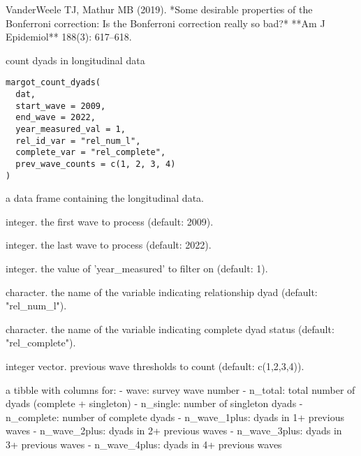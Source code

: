 \documentclass[a4paper]{book}
\begin{document}
%
\begin{References}
VanderWeele TJ, Mathur MB (2019).
*Some desirable properties of the Bonferroni correction:
Is the Bonferroni correction really so bad?*
**Am J Epidemiol** 188(3): 617–618.
\end{References}
%
\begin{Description}
count dyads in longitudinal data
\end{Description}
%
\begin{Usage}
\begin{verbatim}
margot_count_dyads(
  dat,
  start_wave = 2009,
  end_wave = 2022,
  year_measured_val = 1,
  rel_id_var = "rel_num_l",
  complete_var = "rel_complete",
  prev_wave_counts = c(1, 2, 3, 4)
)
\end{verbatim}
\end{Usage}
%
\begin{Arguments}
\begin{ldescription}
\item[\code{dat}] a data frame containing the longitudinal data.

\item[\code{start\_wave}] integer. the first wave to process (default: 2009).

\item[\code{end\_wave}] integer. the last wave to process (default: 2022).

\item[\code{year\_measured\_val}] integer. the value of 'year\_measured' to filter on (default: 1).

\item[\code{rel\_id\_var}] character. the name of the variable indicating relationship dyad (default: "rel\_num\_l").

\item[\code{complete\_var}] character. the name of the variable indicating complete dyad status (default: "rel\_complete").

\item[\code{prev\_wave\_counts}] integer vector. previous wave thresholds to count (default: c(1,2,3,4)).
\end{ldescription}
\end{Arguments}
%
\begin{Value}
a tibble with columns for:
- wave: survey wave number
- n\_total: total number of dyads (complete + singleton)
- n\_single: number of singleton dyads
- n\_complete: number of complete dyads
- n\_wave\_1plus: dyads in 1+ previous waves
- n\_wave\_2plus: dyads in 2+ previous waves
- n\_wave\_3plus: dyads in 3+ previous waves
- n\_wave\_4plus: dyads in 4+ previous waves
\end{Value}
\end{document}
